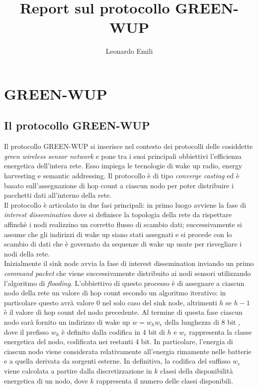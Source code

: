 \documentclass{report}
\title{Report sul protocollo GREEN-WUP}
\author{Leonardo Emili}
\begin{document}
\maketitle
\tableofcontents

\chapter{GREEN-WUP}
\section{Il protocollo GREEN-WUP}

Il protocollo GREEN-WUP si inserisce nel contesto dei protocolli delle cosiddette \emph{green wireless sensor network} e pone tra i suoi principali
obbiettivi l'efficienza energetica dell'intera rete. Esso impiega le tecnologie di wake up radio, energy harvesting e semantic addressing. Il protocollo è
di tipo \emph{converge casting} ed è basato sull'assegnazione di hop count a ciascun nodo per poter distribuire i pacchetti dati
all'interno della rete.\\

Il protocollo è articolato in due fasi principali: in primo luogo avviene la fase di \emph{interest dissemination} dove si definisce la
topologia della rete da rispettare affinchè i nodi realizzino un corretto flusso di scambio dati; successivamente si assume che gli indirizzi di
wake up siano stati assegnati e si procede con lo scambio di dati che è governato da sequenze di wake up usate per risvegliare i nodi della rete. \\

Inizialmente il sink node avvia la fase di interest dissemination inviando
un primo \emph{command packet} che viene successivamente distribuito ai nodi sensori utilizzando l'algoritmo di \emph{flooding}.
L'obbiettivo di questo processo è di assegnare a ciascun nodo della rete un valore di hop count secondo un algoritmo iterativo: in particolare questo
avrà valore 0 nel solo caso del sink node, altrimenti $h$ se $h-1$ è il valore di hop count del nodo precedente. Al termine
di questa fase ciascun nodo sarà fornito un indirizzo di wake up $w=w_{h}w_{e}$ della lunghezza di 8 bit , dove il prefisso $w_{h}$ è definito dalla
codifica in 4 bit di $h$ e $w_{e}$ rappresenta la classe energetica del nodo, codificata nei restanti 4 bit. In particolare, l'energia di ciascun nodo viene
considerata relativamente all'energia rimamente nelle batterie e a quella derivata da sorgenti esterne. In definitiva, la codifica del suffisso $w_{e}$
viene calcolata a partire dalla discretizzazione in $k$ classi della disponibilità energetica di un nodo, dove $k$ rappresenta il numero delle classi
disponibili.\\
\end{document}
